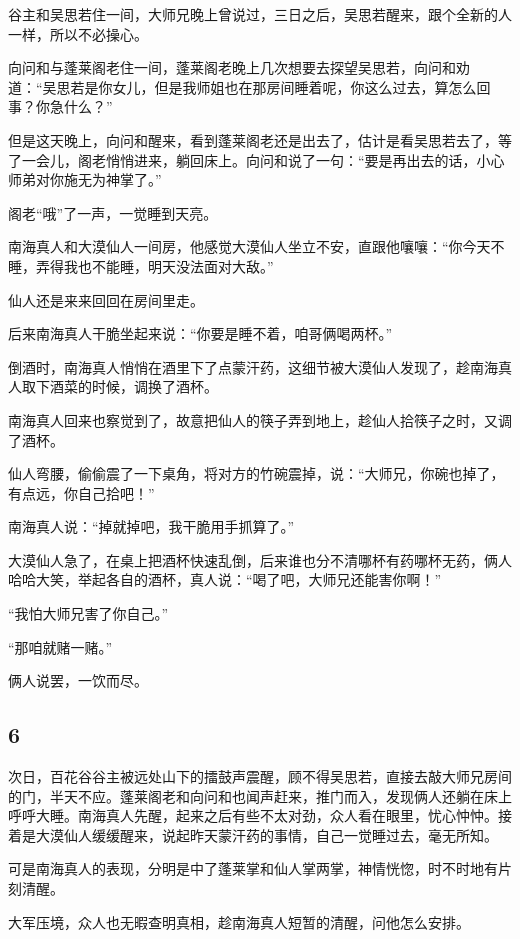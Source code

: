 谷主和吴思若住一间，大师兄晚上曾说过，三日之后，吴思若醒来，跟个全新的人一样，所以不必操心。

向问和与蓬莱阁老住一间，蓬莱阁老晚上几次想要去探望吴思若，向问和劝道：“吴思若是你女儿，但是我师姐也在那房间睡着呢，你这么过去，算怎么回事？你急什么？”

但是这天晚上，向问和醒来，看到蓬莱阁老还是出去了，估计是看吴思若去了，等了一会儿，阁老悄悄进来，躺回床上。向问和说了一句：“要是再出去的话，小心师弟对你施无为神掌了。”

阁老“哦”了一声，一觉睡到天亮。

南海真人和大漠仙人一间房，他感觉大漠仙人坐立不安，直跟他嚷嚷：“你今天不睡，弄得我也不能睡，明天没法面对大敌。”

仙人还是来来回回在房间里走。

后来南海真人干脆坐起来说：“你要是睡不着，咱哥俩喝两杯。”

倒酒时，南海真人悄悄在酒里下了点蒙汗药，这细节被大漠仙人发现了，趁南海真人取下酒菜的时候，调换了酒杯。

南海真人回来也察觉到了，故意把仙人的筷子弄到地上，趁仙人拾筷子之时，又调了酒杯。

仙人弯腰，偷偷震了一下桌角，将对方的竹碗震掉，说：“大师兄，你碗也掉了，有点远，你自己拾吧！”

南海真人说：“掉就掉吧，我干脆用手抓算了。”

大漠仙人急了，在桌上把酒杯快速乱倒，后来谁也分不清哪杯有药哪杯无药，俩人哈哈大笑，举起各自的酒杯，真人说：“喝了吧，大师兄还能害你啊！”

“我怕大师兄害了你自己。”

“那咱就赌一赌。”

俩人说罢，一饮而尽。
\newline

{\centering\subsection{6}}

次日，百花谷谷主被远处山下的擂鼓声震醒，顾不得吴思若，直接去敲大师兄房间的门，半天不应。蓬莱阁老和向问和也闻声赶来，推门而入，发现俩人还躺在床上呼呼大睡。南海真人先醒，起来之后有些不太对劲，众人看在眼里，忧心忡忡。接着是大漠仙人缓缓醒来，说起昨天蒙汗药的事情，自己一觉睡过去，毫无所知。

可是南海真人的表现，分明是中了蓬莱掌和仙人掌两掌，神情恍惚，时不时地有片刻清醒。

大军压境，众人也无暇查明真相，趁南海真人短暂的清醒，问他怎么安排。


